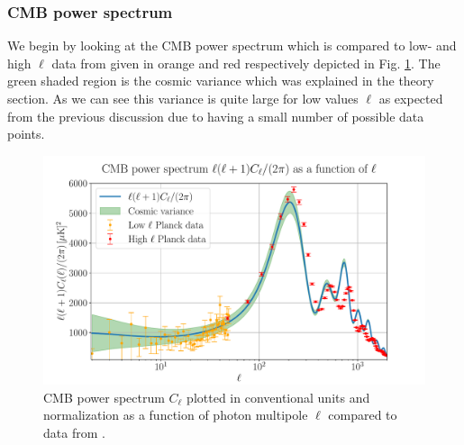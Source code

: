\documentclass[%
reprint,
 amsmath,amssymb,
 aps,
]{revtex4-2}
\begin{document}
\subsubsection{CMB power spectrum}
We begin by looking at the CMB power spectrum which is compared to low- and high $\ell$ data from \cite{Planck:2018vyg} given in orange and red respectively depicted in Fig. \ref{fig:C_ell}. The green shaded region is the cosmic variance which was explained in the theory section. As we can see this variance is quite large for low values $\ell$ as expected from the previous discussion due to having a small number of possible data points. 
\begin{figure}[ht!]
	\includegraphics[width = \linewidth]{Figures/C_ell.pdf}
	\caption{CMB power spectrum $C_\ell$ plotted in conventional units and normalization as a function of photon multipole $\ell$ compared to data from \cite{Planck:2018vyg}.}
	\label{fig:C_ell}
\end{figure}
\end{document}

